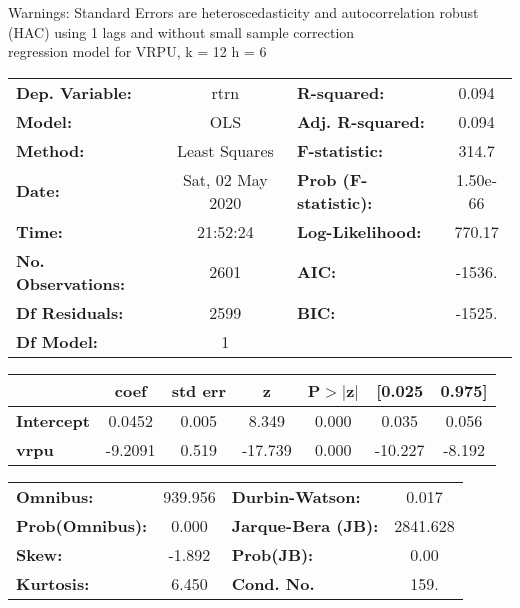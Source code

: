 Warnings: \newline
 [1] Standard Errors are heteroscedasticity and autocorrelation robust (HAC) using 1 lags and without small sample correction\\ 

regression model for VRPU, k = 12 h = 6\begin{center}
\begin{tabular}{lclc}
\toprule
\textbf{Dep. Variable:}    &       rtrn       & \textbf{  R-squared:         } &     0.094   \\
\textbf{Model:}            &       OLS        & \textbf{  Adj. R-squared:    } &     0.094   \\
\textbf{Method:}           &  Least Squares   & \textbf{  F-statistic:       } &     314.7   \\
\textbf{Date:}             & Sat, 02 May 2020 & \textbf{  Prob (F-statistic):} &  1.50e-66   \\
\textbf{Time:}             &     21:52:24     & \textbf{  Log-Likelihood:    } &    770.17   \\
\textbf{No. Observations:} &        2601      & \textbf{  AIC:               } &    -1536.   \\
\textbf{Df Residuals:}     &        2599      & \textbf{  BIC:               } &    -1525.   \\
\textbf{Df Model:}         &           1      & \textbf{                     } &             \\
\bottomrule
\end{tabular}
\begin{tabular}{lcccccc}
                   & \textbf{coef} & \textbf{std err} & \textbf{z} & \textbf{P$> |$z$|$} & \textbf{[0.025} & \textbf{0.975]}  \\
\midrule
\textbf{Intercept} &       0.0452  &        0.005     &     8.349  &         0.000        &        0.035    &        0.056     \\
\textbf{vrpu}      &      -9.2091  &        0.519     &   -17.739  &         0.000        &      -10.227    &       -8.192     \\
\bottomrule
\end{tabular}
\begin{tabular}{lclc}
\textbf{Omnibus:}       & 939.956 & \textbf{  Durbin-Watson:     } &    0.017  \\
\textbf{Prob(Omnibus):} &   0.000 & \textbf{  Jarque-Bera (JB):  } & 2841.628  \\
\textbf{Skew:}          &  -1.892 & \textbf{  Prob(JB):          } &     0.00  \\
\textbf{Kurtosis:}      &   6.450 & \textbf{  Cond. No.          } &     159.  \\
\bottomrule
\end{tabular}
\end{center}

